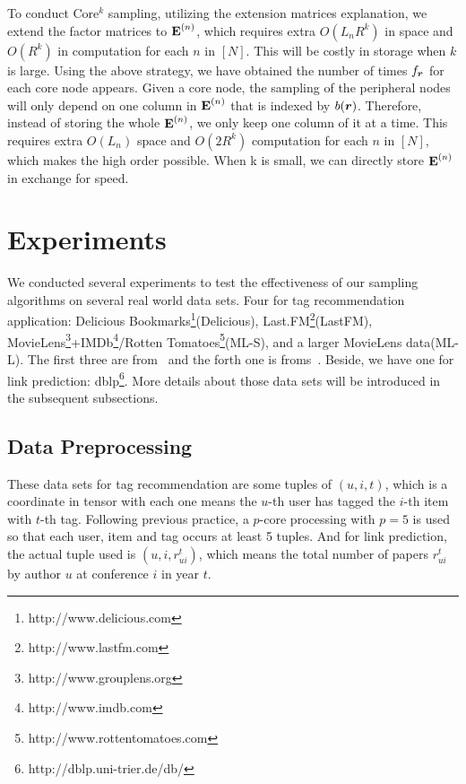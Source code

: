 \documentclass[10pt,journal,compsoc]{IEEEtran}
\newcommand{\V}[1]{{\boldsymbol{{\MakeLowercase{#1}}}}}
\newcommand{\M}[1]{{\textbf{{\MakeUppercase{#1}}}}}
\newcommand{\FacMat}[2]{\M{#1}^{(#2)}}
\begin{document}
To conduct Core$^k$ sampling, utilizing the extension matrices explanation, we extend the factor matrices to $\FacMat{E}{n}$, which requires extra $O(L_nR^k)$ in space and $O(R^k)$ in computation for each $n$ in $[N]$. This will be costly in storage when $k$ is large. Using the above strategy, we have obtained the number of times $f_\V{r}$ for each core node appears. Given a core node, the sampling of the peripheral nodes will only depend on one column in $\FacMat{E}{n}$ that is indexed by $b(\V{r})$. Therefore, instead of storing the whole $\FacMat{E}{n}$, we only keep one column of it at a time. This requires extra $O(L_n)$ space and $O(2R^k)$ computation for each $n$ in $[N]$, which makes the high order possible. When k is small, we can directly store $\FacMat{E}{n}$ in exchange for speed.

\section{Experiments}

We conducted several experiments to test the effectiveness of our sampling algorithms on several real world data sets. Four for tag recommendation application: Delicious Bookmarks\footnote{http://www.delicious.com}(Delicious), Last.FM\footnote{http://www.lastfm.com}(LastFM), MovieLens\footnote{http://www.grouplens.org}+IMDb\footnote{http://www.imdb.com}/Rotten Tomatoes\footnote{http://www.rottentomatoes.com}(ML-S), and a larger MovieLens data(ML-L). The first three are from~\cite{Cantador:RecSys2011} and the forth one is froms~\cite{Harper2015}. Beside, we have one for link prediction: dblp\footnote{http://dblp.uni-trier.de/db/}. More details about those data sets will be introduced in the subsequent subsections.

\subsection{Data Preprocessing}

These data sets for tag recommendation are some tuples of $(u,i,t)$, which is a coordinate in tensor with each one means the $u$-th user has tagged the $i$-th item with $t$-th tag. Following previous practice\cite{Schke2008Tag}, a $p$-core processing with $p=5$ is used so that each user, item and tag occurs at least 5 tuples. And for link prediction, the actual tuple used is $(u,i,r^t_{ui})$, which means the total number of papers $r^t_{ui}$ by author $u$ at conference $i$ in year $t$.
\end{document}
